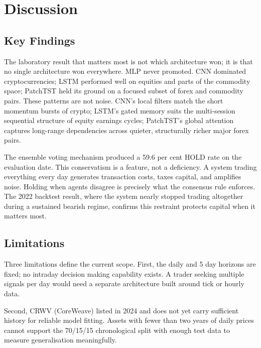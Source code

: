 \documentclass[journal]{IEEEtran}
\begin{document}
\section{Discussion}
\label{sec:discussion}

\subsection{Key Findings}

The laboratory result that matters most is not which architecture won;
it is that no single architecture won everywhere. MLP never promoted. CNN
dominated cryptocurrencies; LSTM performed well on equities and parts of
the commodity space; PatchTST held its ground on a focused subset of forex
and commodity pairs. These patterns are not noise. CNN's local filters
match the short momentum bursts of crypto; LSTM's gated memory suits the
multi-session sequential structure of equity earnings cycles; PatchTST's
global attention captures long-range dependencies across quieter,
structurally richer major forex pairs.

The ensemble voting mechanism produced a 59.6 per cent HOLD rate on the
evaluation date. This conservatism is a feature, not a deficiency. A
system trading everything every day generates transaction costs, taxes
capital, and amplifies noise. Holding when agents disagree is precisely
what the consensus rule enforces. The 2022 backtest result, where the
system nearly stopped trading altogether during a sustained bearish
regime, confirms this restraint protects capital when it matters most.

\subsection{Limitations}

Three limitations define the current scope. First, the daily and 5 day
horizons are fixed; no intraday decision making capability exists. A
trader seeking multiple signals per day would need a separate architecture
built around tick or hourly data.

Second, CRWV (CoreWeave) listed in 2024 and does not yet carry sufficient
history for reliable model fitting. Assets with fewer than two years of
daily prices cannot support the 70/15/15 chronological split with enough
test data to measure generalisation meaningfully.
\end{document}
